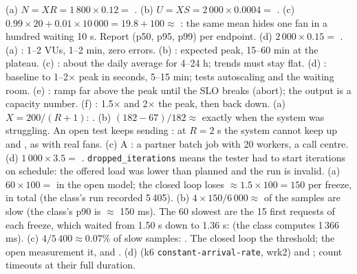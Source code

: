  (a) $N = X R = 1\,800 \times 0.12 =$ . (b) $U = X S = 2\,000 \times 0.0004 =$ . (c) $0.99 \times 20 + 0.01 \times 10\,000 = 19.8 + 100 \approx$ : the same mean hides one fan in a hundred waiting 10 s. Report  (p50, p95, p99) per endpoint. (d) $2\,000 \times 0.15 =$ .
 (a) : 1--2 VUs, 1--2 min, zero errors. (b) : expected peak, 15--60 min at the plateau. (c) : about the daily average for 4--24 h; trends must stay flat. (d) : baseline to 1--2$\times$ peak in seconds, 5--15 min; tests autoscaling and the waiting room. (e) : ramp far above the peak until the SLO breaks (abort); the output is a capacity number. (f) : 1.5$\times$ and 2$\times$ the peak, then back down.
 (a) $X = 200/(R + 1)$: . (b) $(182 - 67)/182 \approx$  exactly when the system was struggling. An open test keeps sending : at $R = 2$ s the system cannot keep up and , as with real fans. (c) A : a partner batch job with 20 workers, a call centre. (d) $1\,000 \times 3.5 =$ . \texttt{dropped\_iterations} means the tester had  to start iterations on schedule: the offered load was lower than planned and the run is invalid.
 (a) $60 \times 100 =$  in the open model; the closed loop loses $\approx 1.5 \times 100 = 150$ per freeze,  in total (the class's run recorded 5\,405). (b) $4 \times 150 / 6\,000 \approx$  of the samples are slow (the class's p90 is $\approx$ 150 ms). The 60 slowest are the 15 first requests of each freeze, which waited from 1.50 s down to 1.36 s:  (the class computes 1\,366 ms). (c) $4/5\,400 \approx 0.07\%$ of slow samples: . The closed loop  the threshold; the open measurement  it, and . (d)  (k6 \texttt{constant-arrival-rate}, wrk2) and ; count timeouts at their full duration.
